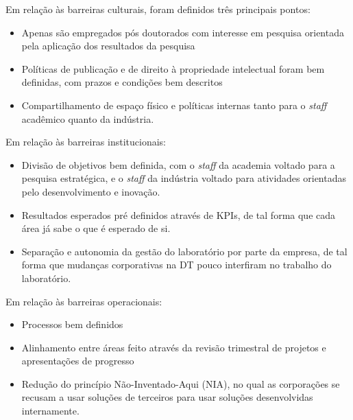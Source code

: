 Em relação às barreiras culturais, foram definidos três principais pontos:
\begin{itemize}
\item Apenas são empregados pós doutorados com interesse em pesquisa orientada pela aplicação dos resultados da pesquisa
\item Políticas de publicação e de direito à propriedade intelectual foram bem definidas, com prazos e condições bem descritos
\item Compartilhamento de espaço físico e políticas internas tanto para o \textit{staff} acadêmico quanto da indústria.
\end{itemize}

Em relação às barreiras institucionais:
\begin{itemize}
\item Divisão de objetivos bem definida, com o \textit{staff} da academia voltado para a pesquisa estratégica, e o \textit{staff} da indústria voltado para atividades orientadas pelo desenvolvimento e inovação.
\item Resultados esperados pré definidos através de KPIs, de tal forma que cada área já sabe o que é esperado de si.
\item Separação e autonomia da gestão do laboratório por parte da empresa, de tal forma que mudanças corporativas na DT pouco interfiram no trabalho do laboratório.
\end{itemize}

Em relação às barreiras operacionais:
\begin{itemize}
\item Processos bem definidos 
\item Alinhamento entre áreas feito através da revisão trimestral de projetos e apresentações de progresso
\item Redução do princípio Não-Inventado-Aqui (NIA), no qual as corporações se recusam a usar soluções de terceiros para usar soluções desenvolvidas internamente.
\end{itemize}

